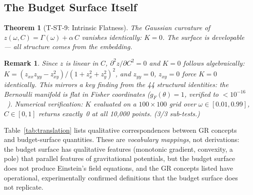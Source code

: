 \documentclass[
  aps,
  prd,
  twocolumn,
  superscriptaddress,
  nofootinbib,
  floatfix
]{revtex4-2}
\newtheorem{theorem}{Theorem}
\newtheorem{remark}{Remark}
\newcommand{\Gam}{\Gamma}
\begin{document}
\subsection{The Budget Surface Itself}

\begin{theorem}[T-ST-9: Intrinsic Flatness]\label{thm:T9}
The Gaussian curvature of $z(\omega, C) = \Gam(\omega) +
\alpha\,C$ vanishes identically: $K = 0$.  The surface is
developable --- all structure comes from the embedding.
\end{theorem}

\begin{remark}
Since $z$ is linear in $C$, $\partial^2 z/\partial C^2 = 0$
and $K = 0$ follows algebraically: $K = (z_{xx}z_{yy} -
z_{xy}^2)/(1 + z_x^2 + z_y^2)^2$, and $z_{yy} = 0$,
$z_{xy} = 0$ force $K = 0$ identically.  This mirrors a key
finding from the 44 structural identities: the Bernoulli
manifold is flat in Fisher coordinates ($g_F(\theta) = 1$,
verified to $< 10^{-16}$~\cite{paulus2025umcp}).  Numerical
verification: $K$ evaluated on a $100 \times 100$ grid over
$\omega \in [0.01, 0.99]$, $C \in [0, 1]$ returns exactly~0
at all 10,000 points.  (3/3 sub-tests.)
\end{remark}

Table~\ref{tab:translation} lists qualitative correspondences
between GR concepts and budget-surface quantities.  These are
\emph{vocabulary mappings}, not derivations: the budget surface
has qualitative features (monotonic gradient, convexity, a pole)
that parallel features of gravitational potentials, but the
budget surface does not produce Einstein's field equations, and
the GR concepts listed have operational, experimentally confirmed
definitions that the budget surface does not replicate.
\end{document}
